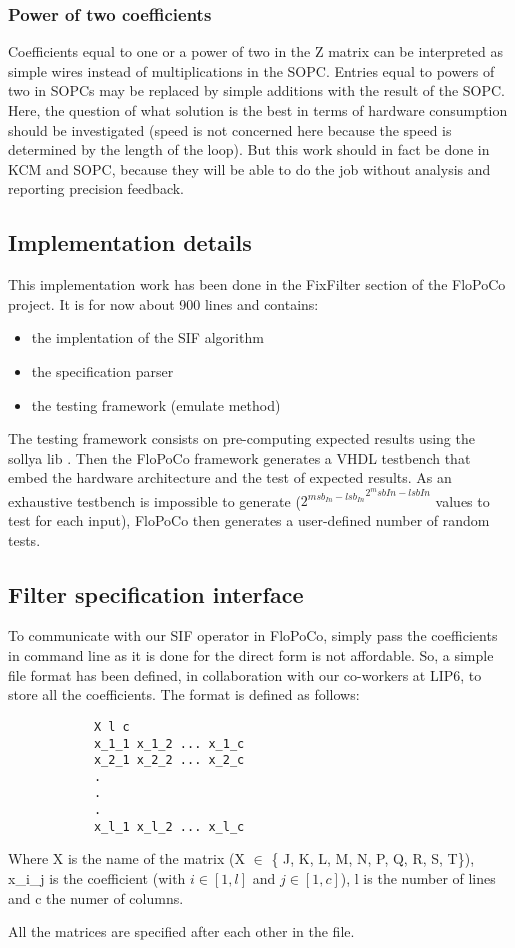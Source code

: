 	\subsubsection{Power of two coefficients}
		Coefficients equal to one or a power of two in the Z matrix can be interpreted as simple wires instead of multiplications in the SOPC.
		Entries equal to powers of two in SOPCs may be replaced by simple additions with the result of the SOPC.
		Here, the question of what solution is the best in terms of hardware consumption should be investigated
		(speed is not concerned here because the speed is determined by the length of the loop).
		But this work should in fact be done in KCM and SOPC, because they will be able to do the job without analysis and reporting precision feedback.

	\subsection{Implementation details}
	This implementation work has been done in the FixFilter section of the FloPoCo project.
	It is for now about 900 lines and contains:
	\begin{itemize}
		\item the implentation of the SIF algorithm
		\item the specification parser
		\item the testing framework (emulate method)
	\end{itemize}

	The testing framework consists on pre-computing expected results using the sollya lib \cite{ChevillardJoldesLauter2010}.
	Then the FloPoCo framework generates a VHDL testbench that embed the hardware architecture and the test of expected results.
	As an exhaustive testbench is impossible to generate (${2^{msb_{In} - lsb_{In}}}^{2^msb{In} - lsb{In}}$ values to test for each input),
	FloPoCo then generates a user-defined number of random tests.

		\subsection{Filter specification interface}
		To communicate with our SIF operator in FloPoCo, simply pass the coefficients in command line as it is done for the direct form is not affordable.
		So, a simple file format has been defined, in collaboration with our co-workers at LIP6, to store all the coefficients.
		The format is defined as follows:

		\begin{verbatim}
			X l c
			x_1_1 x_1_2 ... x_1_c
			x_2_1 x_2_2 ... x_2_c
			.
			.
			.
			x_l_1 x_l_2 ... x_l_c
		\end{verbatim}

		Where X is the name of the matrix (X $\in$ \{ J, K, L, M, N, P, Q, R, S, T\}), x\_i\_j is the coefficient (with $i \in [1, l]$ and $j \in [1, c]$), l is the number of lines and c the numer of columns.

		All the matrices are specified after each other in the file.




